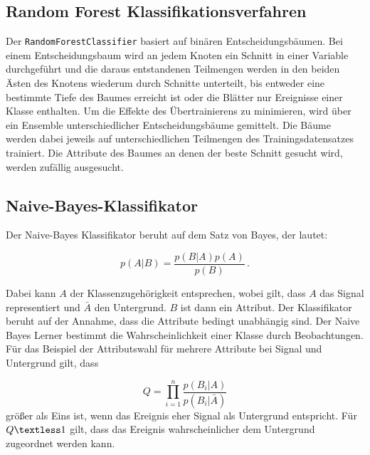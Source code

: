 \subsection{Random Forest Klassifikationsverfahren}
Der \texttt{RandomForestClassifier} basiert auf binären Entscheidungsbäumen.
Bei einem Entscheidungsbaum wird an jedem Knoten ein Schnitt in einer Variable durchgeführt und die daraus entstandenen Teilmengen
werden in den beiden Ästen des Knotens wiederum durch Schnitte unterteilt, bis entweder eine bestimmte Tiefe
des Baumes erreicht ist oder die Blätter nur Ereignisse einer Klasse enthalten. Um die Effekte des Übertrainierens zu minimieren, wird über ein Ensemble unterschiedlicher
Entscheidungsbäume gemittelt.
Die Bäume werden dabei jeweils auf unterschiedlichen Teilmengen des Trainingsdatensatzes trainiert.
Die Attribute des Baumes an denen der beste Schnitt gesucht wird, werden zufällig ausgesucht.

\subsection{Naive-Bayes-Klassifikator}
Der Naive-Bayes Klassifikator beruht auf dem Satz von Bayes, der lautet:

\begin{equation*}
    p\left(A|B \right) = \frac{p\left(B|A \right) p\left(A \right)}{p\left(B \right)} \, .
\end{equation*}

Dabei kann $A$ der Klassenzugehörigkeit entsprechen, wobei gilt, dass
$A$ das Signal representiert und $\bar{A}$ den Untergrund. $B$ ist dann ein
Attribut. Der Klassifikator beruht auf der Annahme, dass die Attribute bedingt
unabhängig sind. Der Naive Bayes Lerner bestimmt die Wahrscheinlichkeit einer
Klasse durch Beobachtungen. Für das Beispiel der Attributswahl für
mehrere Attribute bei Signal und
Untergrund gilt, dass

\begin{equation*}
    Q = \prod\limits_{i = 1}^{n} \frac{p\left(B_i|A \right)}{p\left(B_i|\bar{A} \right)}
\end{equation*}
größer als Eins ist, wenn das Ereignis eher Signal als Untergrund entspricht.
Für $Q \textless 1$ gilt, dass das Ereignis wahrscheinlicher dem Untergrund
zugeordnet werden kann.

